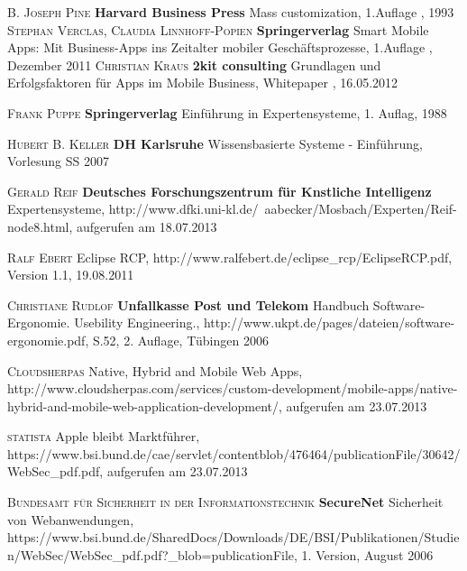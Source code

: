 \begin{thebibliography}{---}
             \textsc{B. Joseph Pine}
            \textbf{Harvard Business Press}
            Mass customization, 1.Auflage , 1993
             \textsc{Stephan Verclas, Claudia Linnhoff-Popien}
            \textbf{Springerverlag}
            Smart Mobile Apps: Mit Business-Apps ins Zeitalter mobiler Geschäftsprozesse, 1.Auflage , Dezember 2011
             \textsc{Christian Kraus}
            \textbf{2kit consulting}
            Grundlagen und Erfolgsfaktoren 
            für Apps im Mobile Business, Whitepaper , 16.05.2012
          
 			 \textsc{Frank Puppe}
 			 \textbf{Springerverlag}
 			 Einführung in Expertensysteme, 1. Auflag, 1988
 			 
  			 \textsc{Hubert B. Keller}
  			 \textbf{DH Karlsruhe}
  			 Wissensbasierte Systeme - Einführung, Vorlesung SS 2007
  			 
             \textsc{Gerald Reif}
            \textbf{Deutsches Forschungszentrum für Knstliche Intelligenz}
            Expertensysteme, http://www.dfki.uni-kl.de/~aabecker/Mosbach/Experten/Reif-node8.html, aufgerufen am 18.07.2013
            
               \textsc{Ralf Ebert}
              Eclipse RCP, http://www.ralfebert.de/eclipse\_rcp/EclipseRCP.pdf, Version 1.1, 19.08.2011
  			
 			
           \textsc{Christiane Rudlof}
          \textbf{Unfallkasse Post und Telekom}
          Handbuch Software-Ergonomie. Usebility Engineering., http://www.ukpt.de/pages/dateien/software-ergonomie.pdf, S.52, 2. Auflage, Tübingen 2006

           \textsc{Cloudsherpas}
          Native, Hybrid and Mobile Web Apps, http://www.cloudsherpas.com/services/custom-development/mobile-apps/native-hybrid-and-mobile-web-application-development/, aufgerufen am 23.07.2013

           \textsc{statista}
          Apple bleibt Marktführer, https://www.bsi.bund.de/cae/servlet/contentblob/476464/publicationFile/30642/WebSec\_pdf.pdf, aufgerufen am 23.07.2013
          
           \textsc{Bundesamt für Sicherheit in der Informationstechnik}
           \textbf{SecureNet}
          Sicherheit von Webanwendungen, https://www.bsi.bund.de/SharedDocs/Downloads/DE/BSI/Publikationen/Studien/WebSec/WebSec\_pdf.pdf?\_blob=publicationFile, 1. Version, August 2006



\end{thebibliography}
